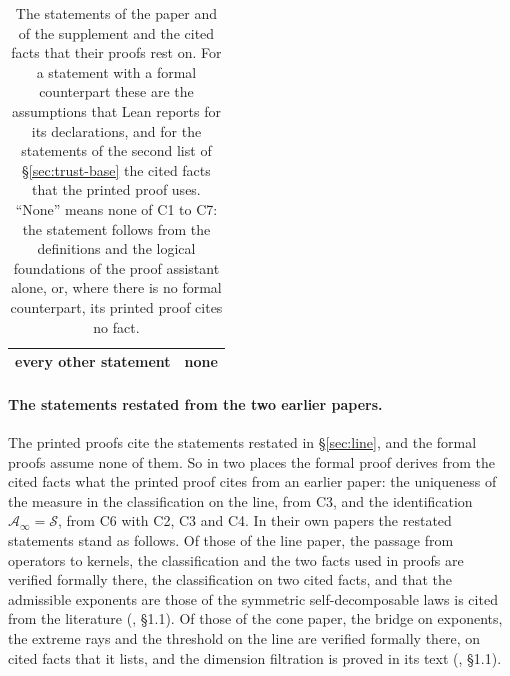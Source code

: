 \begin{table}[!htb]
\begin{tabular}{@{}p{}p{}@{}}
every other statement & none \\
\bottomrule
\end{tabular}
\caption{The statements of the paper and of the supplement and the cited facts that their
proofs rest on. For a statement with a formal counterpart these are
the assumptions that Lean reports for its declarations, and for the statements of the second
list of \S\ref{sec:trust-base} the cited facts that the printed proof uses. ``None'' means none of C1
to C7: the statement follows from the definitions and the logical foundations of the proof
assistant alone, or, where there is no formal counterpart, its printed proof cites no fact.}
\label{tab:trust-base}
\end{table}


\paragraph{The statements restated from the two earlier papers.} The printed proofs cite the
statements restated in \S\ref{sec:line}, and the formal proofs assume none of them. So in two
places the formal proof derives from the cited facts what the printed proof cites from an
earlier paper: the uniqueness of the \Levy{} measure in the classification on the line, from
C3, and the identification $\mathcal{A}_\infty = \mathcal{S}$, from C6 with C2, C3 and C4. In
their own papers the restated statements stand as follows. Of those of the line paper, the
passage from operators to kernels, the classification and the two facts used in proofs are
verified formally there, the classification on two cited facts, and that the admissible
exponents are those of the symmetric self-decomposable laws is cited from the literature
(, \S1.1). Of those of the cone paper, the bridge on exponents,
the extreme rays and the threshold on the line are verified formally there, on cited facts that
it lists, and the dimension filtration is proved in its text (,
\S1.1).

